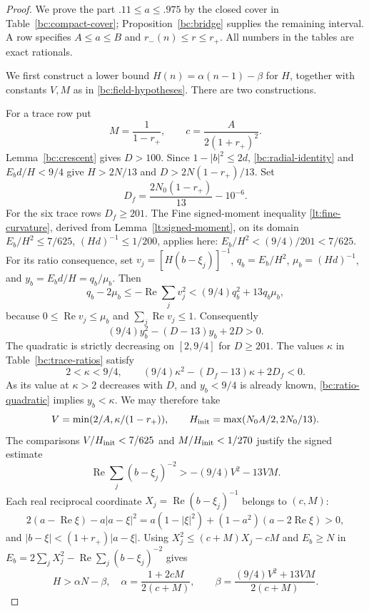\documentclass[11pt,reqno]{amsart}
\numberwithin{equation}{section}
\theoremstyle{definition}
\theoremstyle{remark}
\renewcommand{\Re}{\operatorname{Re}}
\begin{document}
\begin{proof}
We prove the part $.11\leq a\leq.975$ by the closed cover in
Table~\ref{bc:compact-cover}; Proposition~\ref{bc:bridge} supplies
the remaining interval.  A row specifies $A\leq a\leq B$ and
$r_-(n)\leq r\leq r_+$.
All numbers in the tables are exact rationals.

We first construct a lower bound $H(n)=\alpha(n-1)-\beta$ for $H$,
together with constants $V,M$ as in \eqref{bc:field-hypotheses}.
There are two constructions.

For a trace row put
\[
 M=\frac1{1-r_+},\qquad c=\frac{A}{2(1+r_+)^2}.
\]
Lemma~\ref{bc:crescent} gives $D>100$.
Since $1-|b|^2\leq2d$, \eqref{bc:radial-identity} and
$E_bd/H<9/4$ give $H>2N/13$ and
$D>2N(1-r_+)/13$.
Set
\begin{equation}\label{bc:Dfloor}
 D_f=\frac{2N_0(1-r_+)}{13}-10^{-6}.
\end{equation}
For the six trace rows $D_f\geq201$.
The Fine signed-moment inequality \eqref{lt:fine-curvature}, derived
from Lemma~\ref{lt:signed-moment},
on its domain $E_b/H^2\leq7/625$, $(Hd)^{-1}\leq1/200$,
applies here: $E_b/H^2<(9/4)/201<7/625$.
For its ratio consequence, set
$v_j=[H(b-\xi_j)]^{-1}$, $q_b=E_b/H^2$,
$\mu_b=(Hd)^{-1}$, and $y_b=E_bd/H=q_b/\mu_b$.
Then
\[
 q_b-2\mu_b
 \leq-\Re\sum_jv_j^2
 <(9/4)q_b^2+13q_b\mu_b,
\]
because $0\leq\Re v_j\leq\mu_b$ and
$\sum_j\Re v_j\leq1$.
Consequently
\begin{equation}\label{bc:ratio-quadratic}
 (9/4)y_b^2-(D-13)y_b+2D>0.
\end{equation}
The quadratic is strictly decreasing on $[2,9/4]$ for $D\geq201$.
The values $\kappa$ in Table~\ref{bc:trace-ratios} satisfy
\begin{equation}\label{bc:kappa-gate}
 2<\kappa<9/4,\qquad
 (9/4)\kappa^2-(D_f-13)\kappa+2D_f<0.
\end{equation}
As its value at $\kappa>2$ decreases with $D$, and $y_b<9/4$ is
already known, \eqref{bc:ratio-quadratic} implies $y_b<\kappa$.
We may therefore take
\[
 V=\min(2/A,\kappa/(1-r_+)),\qquad
 H_{\rm init}=\max(N_0A/2,2N_0/13).
\]
The comparisons $V/H_{\rm init}<7/625$ and
$M/H_{\rm init}<1/270$ justify the signed estimate
\[
 \Re\sum_j(b-\xi_j)^{-2}>-(9/4)V^2-13VM.
\]
Each real reciprocal coordinate
$X_j=\Re(b-\xi_j)^{-1}$ belongs to $(c,M)$:
\[
 2(a-\Re\xi)-a|a-\xi|^2
 =a(1-|\xi|^2)+(1-a^2)(a-2\Re\xi)>0,
\]
and $|b-\xi|<(1+r_+)|a-\xi|$.
Using $X_j^2\leq(c+M)X_j-cM$ and $E_b\geq N$ in
$E_b=2\sum_jX_j^2-\Re\sum_j(b-\xi_j)^{-2}$ gives
\begin{equation}\label{bc:trace-field}
 H>\alpha N-\beta,\quad
 \alpha=\frac{1+2cM}{2(c+M)},\qquad
 \beta=\frac{(9/4)V^2+13VM}{2(c+M)}.
\end{equation}


\end{proof}
\end{document}
